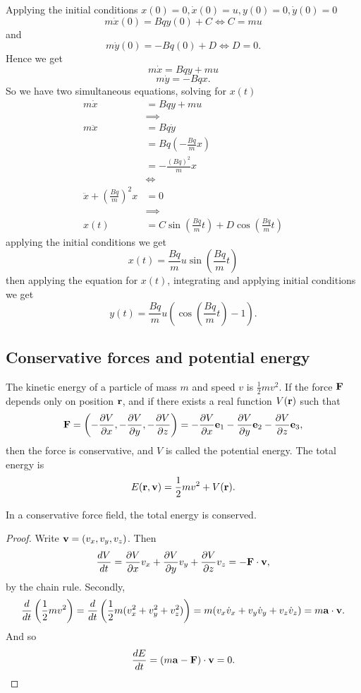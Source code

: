 \documentclass[10pt, a4paper]{article}
\begin{document}
\begin{example}
    Applying the initial conditions $x(0) = 0, \dot{x}(0) = u, y(0) = 0, \dot{y}(0) = 0$
    \[
    m\dot{x}(0) = Bqy(0) + C \iff C = mu
    \]
    and
    \[
    m\dot{y}(0) = -Bq(0) + D \iff D = 0.
    \]
    Hence we get
    \[
    m\dot{x} = Bqy + mu
    \]
    \[
    m\dot{y} = -Bqx.
    \]
    So we have two simultaneous equations,
    solving for $x(t)$
    \begin{align*}
        m\dot{x} &= Bqy + mu \\
        &\implies \\
        m\ddot{x} &= Bq\dot{y} \\
        &= Bq\left(-\frac{Bq}{m}x\right) \\
        &= -\frac{(Bq) ^ 2}{m}x \\
        &\iff \\
        \ddot{x} + \left(\frac{Bq}{m}\right) ^ 2x &= 0 \\
        &\implies \\
        x(t) &= C\sin\left(\frac{Bq}{m}t\right) + D\cos\left(\frac{Bq}{m}t\right)
    \end{align*}
    applying the initial conditions we get
    \[
    x(t) = \frac{Bq}{m}u\sin\left(\frac{Bq}{m}t\right)
    \]
    then applying the equation for $x(t)$,
    integrating and applying initial conditions we get
    \[
    y(t) = \frac{Bq}{m}u\left(\cos\left(\frac{Bq}{m}t\right) - 1\right).
    \]
\end{example}

\subsection{Conservative forces and potential energy}
The kinetic energy of a particle of mass $m$ and speed $v$ is $\frac{1}{2}mv ^ 2$.
If the force $\mbf{F}$ depends only on position $\mbf{r}$,
and if there exists a real function $V(\mbf{r})$ such that
\[
\mbf{F} = \left(-\pd[V]{x}, -\pd[V]{y}, -\pd[V]{z}\right) = -\pd[V]{x}\mbf{e}_1 -\pd[V]{y}\mbf{e}_2 - \pd[V]{z}\mbf{e}_3,
\]
then the force is conservative,
and $V$ is called the potential energy.
The total energy is
\[
E(\mbf{r}, \mbf{v}) = \frac{1}{2}mv ^ 2 + V(\mbf{r}).
\]

\begin{proposition}
    In a conservative force field,
    the total energy is conserved.

    \begin{proof}
        Write $\mbf{v} = (v_x, v_y, v_z)$.
        Then
        \[
        \frac{dV}{dt} = \pd[V]{x}v_x + \pd[V]{y}v_y + \pd[V]{z}v_z = -\mbf{F} \cdot \mbf{v},
        \]
        by the chain rule.
        Secondly,
        \[
        \frac{d}{dt}\left(\frac{1}{2}mv ^ 2\right) = \frac{d}{dt}\left(\frac{1}{2}m(v_x ^ 2 + v_y ^ 2 + v_z ^ 2)\right) = m(v_x\dot{v}_x + v_y\dot{v}_y + v_z\dot{v}_z) = m\mbf{a} \cdot \mbf{v}.
        \]
        And so
        \[
        \frac{dE}{dt} = (m\mbf{a} - \mbf{F}) \cdot \mbf{v} = 0.
        \]
    \end{proof}
\end{proposition}
\end{document}
